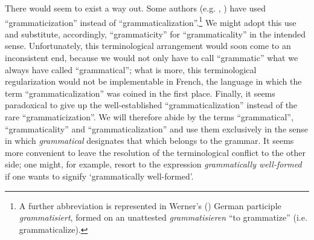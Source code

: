 \label{page11}There would seem to exist a way out. Some authors (e.g. \citealt[49]{Givón1975}, \citealt[489]{Bolinger1978}) have used ``grammaticization'' instead of ``grammaticalization''.\footnote{A further abbreviation is represented in Werner's (\citeyear[965f]{Werner1979}) German participle \textit{grammatisiert}, formed on an unattested \textit{grammatisieren} “to grammatize” (i.e. grammaticalize).} We might adopt this use and substitute, accordingly, ``grammaticity'' for ``grammaticality'' in the intended sense. Unfortunately, this terminological arrangement would soon come to an inconsistent end, because we would not only have to call ``grammatic'' what we always have called ``grammatical''; what is more, this terminological regularization would not be implementable in French, the language in which the term ``grammaticalization'' was coined in the first place. Finally, it seems paradoxical to give up the well-established ``grammaticalization'' instead of the rare ``grammaticization''. We will therefore abide by the terms ``grammatical'', ``grammaticality'' and ``grammaticalization'' and use them exclusively in the sense in which \textit{grammatical} designates that which belongs to the grammar. It seems more convenient to leave the resolution of the terminological conflict to the other side; one might, for example, resort to the expression \textit{grammatically well-formed} if one wants to signify `grammatically well-formed'.

